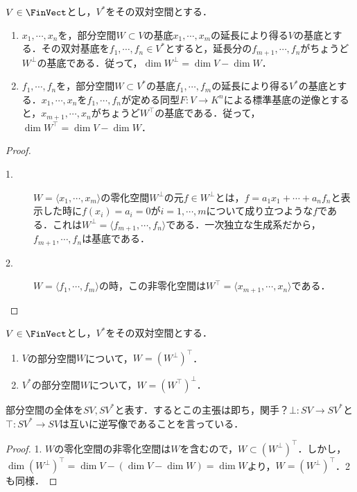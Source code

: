 \documentclass[uplatex, dvipdfmx]{jsreport}
\begin{document}
\begin{proposition}
    $V\in\FinVect$とし，$V^*$をその双対空間とする．
    \begin{enumerate}
        \item $x_1,\cdots,x_n$を，部分空間$W\subset V$の基底$x_1,\cdots,x_m$の延長により得る$V$の基底とする．その双対基底を$f_1,\cdots,f_n\in V^*$とすると，延長分の$f_{m+1},\cdots,f_n$がちょうど$W^\bot$の基底である．従って，$\dim W^\bot=\dim V-\dim W$．
        \item $f_1,\cdots,f_n$を，部分空間$W\subset V^*$の基底$f_1,\cdots,f_m$の延長により得る$V^*$の基底とする．$x_1,\cdots,x_n$を$f_1,\cdots,f_n$が定める同型$F:V\to K^n$による標準基底の逆像とすると，$x_{m+1},\cdots,x_n$がちょうど$W^\top$の基底である．従って，$\dim W^\top=\dim V-\dim W$．
    \end{enumerate}
\end{proposition}
\begin{proof}\mbox{}
    \begin{description}
        \item[1.] $W=\langle x_1,\cdots,x_m\rangle$の零化空間$W^\bot$の元$f\in W^\bot$とは，$f=a_1x_1+\cdots+a_nf_n$と表示した時に$f(x_i)=a_i=0$が$i=1,\cdots,m$について成り立つような$f$である．これは$W^\bot=\langle f_{m+1},\cdots,f_n\rangle$である．一次独立な生成系だから，$f_{m+1},\cdots,f_n$は基底である．
        \item[2.] $W=\langle f_1,\cdots,f_m\rangle$の時，この非零化空間は$W^\top=\langle x_{m+1},\cdots,x_n\rangle$である．
    \end{description}
\end{proof}

\begin{corollary}\label{cor-biannihilator-in-finite-situation}
    $V\in\FinVect$とし，$V^*$をその双対空間とする．
    \begin{enumerate}
        \item $V$の部分空間$W$について，$W=(W^\bot)^\top$．
        \item $V^*$の部分空間$W$について，$W=(W^\top)^\bot$．
    \end{enumerate}
    部分空間の全体を$SV,SV^*$と表す．するとこの主張は即ち，関手？$\bot:SV\to SV^*$と$\top:SV^*\to SV$は互いに逆写像であることを言っている．
\end{corollary}
\begin{proof}
    1. $W$の零化空間の非零化空間は$W$を含むので，$W\subset(W^\bot)^\top$．しかし，$\dim(W^\bot)^\top=\dim V-(\dim V-\dim W)=\dim W$より，$W=(W^\bot)^\top$．2も同様．
\end{proof}
\end{document}
